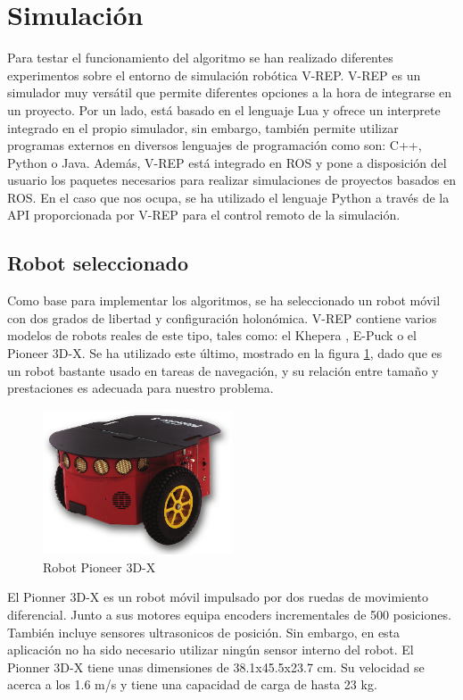 \section{Simulación}
\label{simulacion}

Para testar el funcionamiento del algoritmo se han realizado diferentes experimentos sobre el entorno de simulación robótica V-REP. V-REP es un simulador muy versátil que permite diferentes opciones a la hora de integrarse en un proyecto. Por un lado, está basado en el lenguaje Lua y ofrece un interprete integrado en el propio simulador, sin embargo, también permite utilizar programas externos en diversos lenguajes de programación como son: C++, Python o Java. Además, V-REP está integrado en ROS y pone a disposición del usuario los paquetes necesarios para realizar simulaciones de proyectos basados en ROS. En el caso que nos ocupa, se ha utilizado el lenguaje Python a través de la API proporcionada por V-REP para el control remoto de la simulación.

\subsection{Robot seleccionado}

Como base para implementar los algoritmos, se ha seleccionado un robot móvil con dos grados de libertad y configuración holonómica. V-REP contiene varios modelos de robots reales de este tipo, tales como: el Khepera , E-Puck o el Pioneer 3D-X. Se ha utilizado este último, mostrado en la figura \ref{fig:pioneer}, dado que es un robot bastante usado en tareas de navegación, y su relación entre tamaño y prestaciones es adecuada para nuestro problema.

\begin{figure}[h]
		\centering
        \includegraphics[width=0.5\textwidth]{images/pioneer.png}
        \caption{Robot Pioneer 3D-X}
        \label{fig:pioneer}
\end{figure} 

El Pionner 3D-X es un robot móvil impulsado por dos ruedas de movimiento diferencial. Junto a sus motores equipa encoders incrementales de 500 posiciones. También incluye sensores ultrasonicos de posición. Sin embargo, en esta aplicación no ha sido necesario utilizar ningún sensor interno del robot. El Pionner 3D-X tiene unas dimensiones de 38.1x45.5x23.7 cm. Su velocidad se acerca a los 1.6 m/s y tiene una capacidad de carga de hasta 23 kg.

